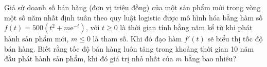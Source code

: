 \begin{ex}%
	Giả sử doanh số bán hàng (đơn vị triệu đồng) của một sản phẩm mới trong vòng một số năm nhất định tuân theo quy luật logistic được mô hình hóa bằng hàm số $f\left(t \right)=500\left(t^2+m\mathrm{e}^{-t} \right)$, với $t\ge 0$ là thời gian tính bằng năm kể từ khi phát hành sản phẩm mới, $m\le 0$ là tham số. Khi đó đạo hàm $f'\left(t \right)$ sẽ biểu thị tốc độ bán hàng. Biết rằng tốc độ bán hàng luôn tăng trong khoảng thời gian 10 năm đầu phát hành sản phẩm, khi đó giá trị nhỏ nhất của $m$ bằng bao nhiêu?
\end{ex}

